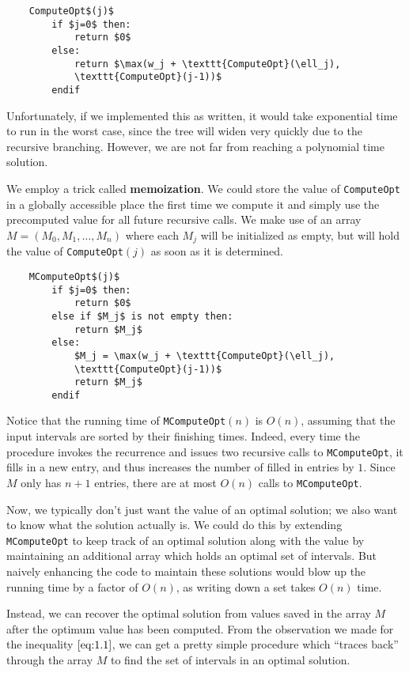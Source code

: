 \begin{lstlisting}
    ComputeOpt$(j)$
        if $j=0$ then:
            return $0$
        else: 
            return $\max(w_j + \texttt{ComputeOpt}(\ell_j), 
            \texttt{ComputeOpt}(j-1))$
        endif
\end{lstlisting}

\newpage 
Unfortunately, if we implemented this as written, it would take exponential
time to run in the worst case, since the tree will widen very quickly 
due to the recursive branching. However, we are not far from reaching a 
polynomial time solution. 

We employ a trick called {\bf memoization}. We could store the value of 
\texttt{ComputeOpt} in a globally accessible place the first time we compute 
it and simply use the precomputed value for all future recursive calls. 
We make use of an array $M = (M_0, M_1, \dots, M_n)$ where each $M_j$ 
will be initialized as empty, but will hold the value of \texttt{ComputeOpt}$(j)$
as soon as it is determined. 

\begin{lstlisting}
    MComputeOpt$(j)$
        if $j=0$ then:
            return $0$
        else if $M_j$ is not empty then:
            return $M_j$
        else:
            $M_j = \max(w_j + \texttt{ComputeOpt}(\ell_j), 
            \texttt{ComputeOpt}(j-1))$
            return $M_j$
        endif
\end{lstlisting}

Notice that the running time of \texttt{MComputeOpt}$(n)$ is $O(n)$, assuming 
that the input intervals are sorted by their finishing times. Indeed, 
every time the procedure invokes the recurrence and issues two recursive 
calls to \texttt{MComputeOpt}, it fills in a new entry, and thus increases 
the number of filled in entries by $1$. Since $M$ only has $n+1$ entries, 
there are at most $O(n)$ calls to \texttt{MComputeOpt}.

Now, we typically don't just want the value of an optimal solution; we 
also want to know what the solution actually is. We could do this by 
extending \texttt{MComputeOpt} to keep track of an optimal solution 
along with the value by maintaining an additional array which holds an 
optimal set of intervals. But naively enhancing the code to maintain these 
solutions would blow up the running time by a factor of $O(n)$, as writing 
down a set takes $O(n)$ time. 

Instead, we can recover the optimal solution from values saved in the array 
$M$ after the optimum value has been computed. From the observation we made 
for the inequality $\eqref{eq:1.1}$, we can get a pretty simple procedure which 
``traces back'' through the array $M$ to find the set of intervals in an 
optimal solution. 

